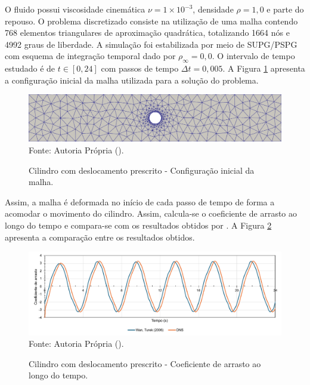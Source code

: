 O fluido possui viscosidade cinemática $\nu=1\times10^{-3}$, densidade $\rho=1,0$ e parte do repouso. O problema discretizado consiste na utilização de uma malha contendo 768 elementos triangulares de aproximação quadrática, totalizando 1664 nós e 4992 graus de liberdade. A simulação foi estabilizada por meio de SUPG/PSPG com esquema de integração temporal dado por $\rho_\infty=0,0$. O intervalo de tempo estudado é de $t\in[0,24]$ com passos de tempo $\Delta t=0,005$. A Figura \ref{fig:moving-cylinder-mesh} apresenta a configuração inicial da malha utilizada para a solução do problema.

\begin{figure}[h!]
    \centering
    \caption{Cilindro com deslocamento prescrito - Configuração inicial da malha.}
    \includegraphics[width=\linewidth]{Figuras/moving-cylinder/mesh1.png}
    \\Fonte: Autoria Própria (\the\year).
    \label{fig:moving-cylinder-mesh}
\end{figure}

Assim, a malha é deformada no início de cada passo de tempo de forma a acomodar o movimento do cilindro. Assim, calcula-se o coeficiente de arrasto ao longo do tempo e compara-se com os resultados obtidos por . A Figura \ref{fig:moving-cylinder-results} apresenta a comparação entre os resultados obtidos.

\begin{figure}[h!]
    \centering
    \caption{Cilindro com deslocamento prescrito - Coeficiente de arrasto ao longo do tempo.}
    \includegraphics[width=\linewidth]{Figuras/moving-cylinder/Cd.pdf}
    \\Fonte: Autoria Própria (\the\year).
    \label{fig:moving-cylinder-results}
\end{figure}

